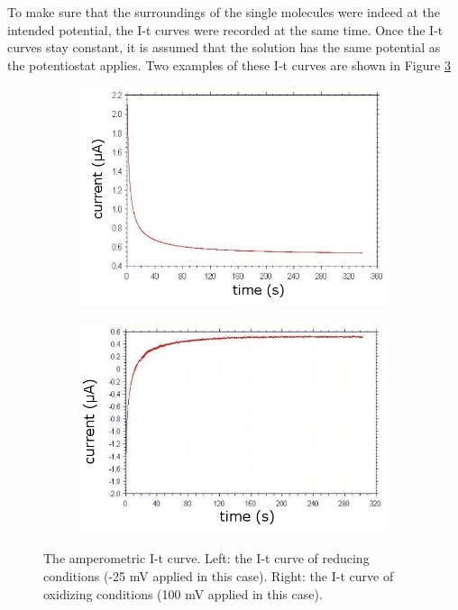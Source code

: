 \documentclass[twoside,single]{lion-msc}
\begin{document}
To make sure that the surroundings of the single molecules were indeed at the intended potential, the I-t curves were recorded at the same time. Once the I-t curves stay constant, it is assumed that the solution has the same potential as the potentiostat applies. Two examples of these I-t curves are shown in Figure \ref{it_curves}

\begin{figure}[ht!]
\begin{subfigure}{.5\textwidth}
  \centering
  \includegraphics[width= \textwidth]{it25mV}

  \label{}
\end{subfigure}%
\begin{subfigure}{.5\textwidth}
  \centering
  \includegraphics[width=.95 \linewidth]{it100mV}
  \label{}
\end{subfigure}
\caption{The amperometric I-t curve.  Left: the I-t curve of reducing conditions (-25 mV applied in this case). Right: the I-t curve of oxidizing conditions (100 mV applied in this case).}
\label{it_curves}
\end{figure}
\end{document}
